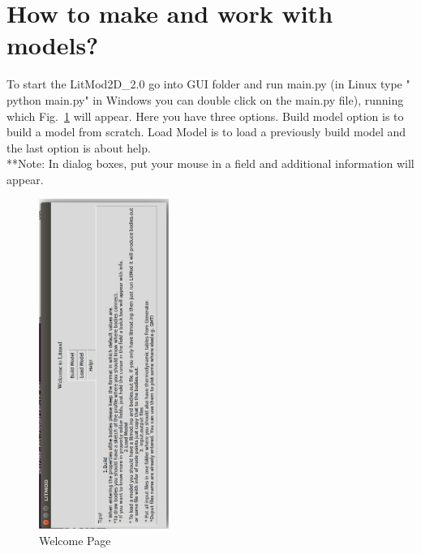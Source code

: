 \documentclass[14pt]{article}
\begin{document}
\section{How to make and work with models?}
To start the LitMod2D\_2.0 go into GUI folder and run main.py (in Linux type " python main.py" in Windows you can double click on the main.py file), running which Fig.~\ref{welcome} will appear. Here you have three options. Build model option is to build a model from scratch. Load Model is to load a previously build model and the last option is about help.\\
**Note: In dialog boxes, put your mouse in a field and additional information will appear. 
\begin{figure}
\centering \includegraphics[width=10pc,angle=-90]{./welcome.eps}
\caption{Welcome Page}
\label{welcome}
\end{figure}
\end{document}
